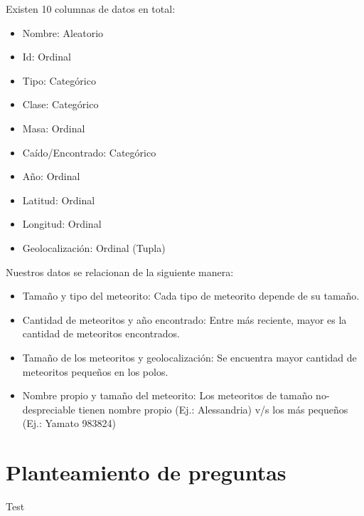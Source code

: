 \documentclass[letterpaper,10pt]{article}
\begin{document}
	Existen 10 columnas de datos en total:

	\begin{itemize}
		\item Nombre: Aleatorio
		\item Id: Ordinal
		\item Tipo: Categórico
		\item Clase: Categórico
		\item Masa: Ordinal

		\item Caído/Encontrado: Categórico
		\item Año: Ordinal
		\item Latitud: Ordinal
		\item Longitud: Ordinal
		\item Geolocalización: Ordinal (Tupla)
	\end{itemize}

	Nuestros datos se relacionan de la siguiente manera:

	\begin{itemize}
		\item Tamaño y tipo del meteorito: Cada tipo de meteorito depende de su tamaño.
		\item Cantidad de meteoritos y año encontrado: Entre más reciente, mayor es la cantidad de meteoritos encontrados.
		\item Tamaño de los meteoritos y geolocalización: Se encuentra mayor cantidad de meteoritos pequeños en los polos.
		\item Nombre propio y tamaño del meteorito: Los meteoritos de tamaño no-despreciable tienen nombre propio (Ej.: Alessandria) v/s los más pequeños (Ej.: Yamato 983824)
	\end{itemize}

	\newpage

	\section{Planteamiento de preguntas}
	
	Test
	
\end{document}
